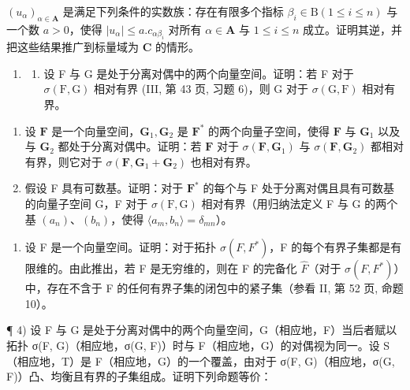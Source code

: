 \((u_{\alpha})_{\alpha \in \mathbf{A}}\) 是满足下列条件的实数族：存在有限多个指标 \(\beta_{i}\in \mathrm{B}(1\leqslant i\leqslant n)\) 与一个数 \(a > 0\)，使得 \(|u_{\alpha}|\leqslant a.c_{\alpha \beta_i}\) 对所有 \(\alpha \in \mathbf{A}\) 与 \(1\leqslant i\leqslant n\) 成立。证明其逆，并把这些结果推广到标量域为 \(\mathbf{C}\) 的情形。

\begin{enumerate}
\def\labelenumi{\arabic{enumi})}
\setcounter{enumi}{1}
\tightlist
\item
  \begin{enumerate}
  \def\labelenumii{\alph{enumii})}
  \tightlist
  \item
    设 F 与 G 是处于分离对偶中的两个向量空间。证明：若 F 对于 \(\sigma(\mathrm{F}, \mathrm{G})\) 相对有界 (III, 第 43 页, 习题 6)，则 G 对于 \(\sigma(\mathrm{G}, \mathrm{F})\) 相对有界。
  \end{enumerate}
\end{enumerate}

\begin{enumerate}
\def\labelenumi{\alph{enumi})}
\setcounter{enumi}{1}
\item
  设 \(\mathbf{F}\) 是一个向量空间，\(\mathbf{G}_1, \mathbf{G}_2\) 是 \(\mathbf{F}^*\) 的两个向量子空间，使得 \(\mathbf{F}\) 与 \(\mathbf{G}_1\) 以及与 \(\mathbf{G}_2\) 都处于分离对偶中。证明：若 \(\mathbf{F}\) 对于 \(\sigma(\mathbf{F}, \mathbf{G}_1)\) 与 \(\sigma(\mathbf{F}, \mathbf{G}_2)\) 都相对有界，则它对于 \(\sigma(\mathbf{F}, \mathbf{G}_1 + \mathbf{G}_2)\) 也相对有界。
\item
  假设 F 具有可数基。证明：对于 \(\mathbf{F}^*\) 的每个与 F 处于分离对偶且具有可数基的向量子空间 G，F 对于 \(\sigma(\mathrm{F},\mathrm{G})\) 相对有界（用归纳法定义 F 与 G 的两个基 \((a_n)\)、\((b_n)\)，使得 \(\langle a_m, b_n \rangle = \delta_{mn}\)）。
\end{enumerate}

\begin{enumerate}
\def\labelenumi{\arabic{enumi})}
\setcounter{enumi}{2}
\tightlist
\item
  设 F 是一个向量空间。证明：对于拓扑 \(\sigma(F, F^{*})\)，F 的每个有界子集都是有限维的。由此推出，若 F 是无穷维的，则在 F 的完备化 \(\hat{F}\)（对于 \(\sigma(F, F^{*})\)）中，存在不含于 F 的任何有界子集的闭包中的紧子集（参看 II, 第 52 页, 命题 10）。
\end{enumerate}

¶ 4) 设 F 与 G 是处于分离对偶中的两个向量空间，G（相应地，F）当后者赋以拓扑 σ(F, G)（相应地，σ(G, F)）时与 F（相应地，G）的对偶视为同一。设 S（相应地，T）是 F（相应地，G）的一个覆盖，由对于 σ(F, G)（相应地，σ(G, F)）凸、均衡且有界的子集组成。证明下列命题等价：

